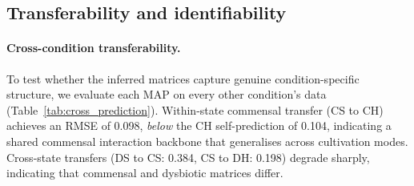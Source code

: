 \documentclass[pdflatex,sn-mathphys-ay,lineno]{sn-jnl}%
\begin{document}
%
%


\subsection{Transferability and identifiability}
\label{sec:sensitivity}

\paragraph{Cross-condition transferability.}
To test whether the inferred matrices capture genuine condition-specific structure, we evaluate each MAP on every other condition's data (Table~\ref{tab:cross_prediction}).
Within-state commensal transfer (CS to CH) achieves an RMSE of 0.098, \emph{below} the CH self-prediction of 0.104, indicating a shared commensal interaction backbone that generalises across cultivation modes.
Cross-state transfers (DS to CS: 0.384, CS to DH: 0.198) degrade sharply, indicating that commensal and dysbiotic matrices differ.

\begin{table}[htbp]
\centering\small

\caption{Cross-condition prediction RMSE. Rows: condition whose MAP is used; columns: data. Diagonal (bold): self-prediction, equal to the calibrated RMSE.}
\label{tab:cross_prediction}
\end{table}
\end{document}
